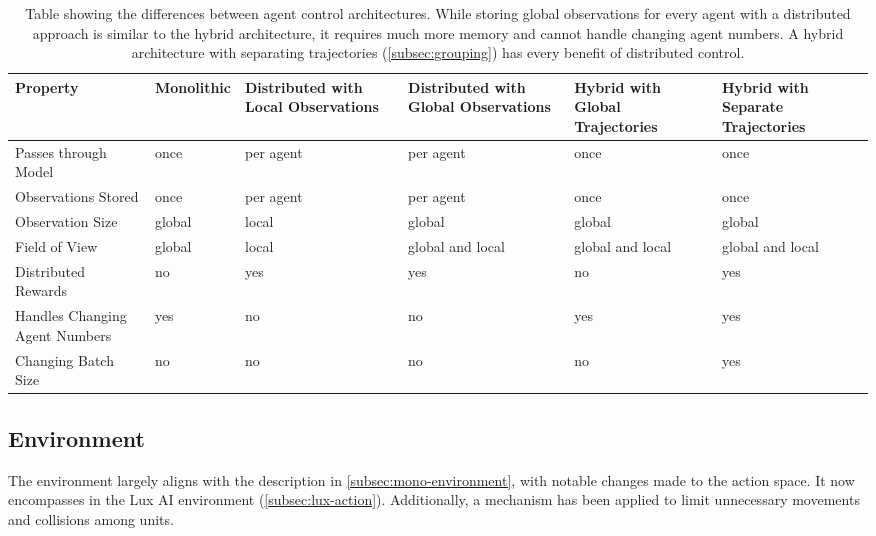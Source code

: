 \begin{table}[htbp]
    \centering
    \begin{tabularx}{\linewidth}{Y|C{1.9cm}|C{2.3cm}|C{2.3cm}|C{2.3cm}|C{2.3cm}}
        \toprule
        \textbf{Property} & \textbf{Monolithic} & \textbf{Distributed with Local Observations} & \textbf{Distributed with Global Observations} & \textbf{Hybrid with Global Trajectories} & \textbf{Hybrid with Separate Trajectories} \\
        \midrule
        Passes through Model & once & per agent & per agent & once & once \\
        \midrule
        Observations Stored & once & per agent & per agent & once & once \\
        \midrule
        Observation Size & global & local & global & global & global \\
        \midrule
        Field of View & global & local & global and local & global and local & global and local \\
        \midrule
        Distributed Rewards & no & yes & yes & no & yes \\
        \midrule
        Handles Changing Agent Numbers & yes & no & no & yes & yes \\
        \midrule
        Changing Batch Size & no & no & no & no & yes \\
        \bottomrule
    \end{tabularx}
    \captionsetup{justification=justified, singlelinecheck=false, width=1\linewidth, labelfont=bf} 
    \caption{Table showing the differences between agent control architectures. While storing global observations for every agent with a distributed approach is similar to the hybrid architecture, it requires much more memory and cannot handle changing agent numbers. A hybrid architecture with separating trajectories (\autoref{subsec:grouping}) has every benefit of distributed control.}
    \label{tab:hybrid-table}
\end{table}

\subsection{Environment}

\noindent The environment largely aligns with the description in \autoref{subsec:mono-environment}, with notable changes made to the action space. It now encompasses  in the Lux AI environment (\autoref{subsec:lux-action}). Additionally, a  mechanism has been applied to limit unnecessary movements and collisions among units.


